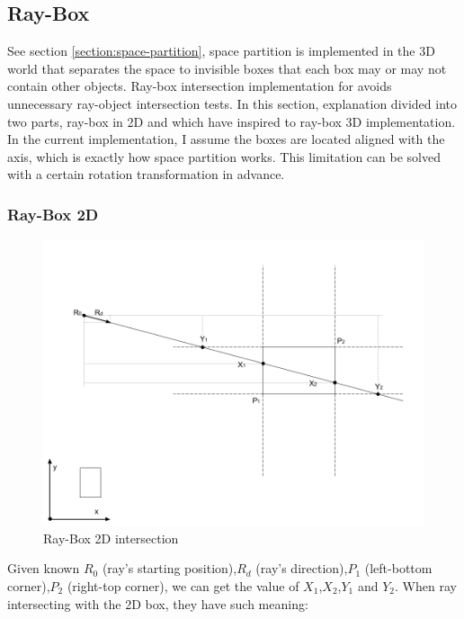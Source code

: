 \subsection{Ray-Box}
\label{section:ray-box}

See section \ref{section:space-partition}, space partition is implemented in the 3D world that separates the space to invisible boxes that each box may or may not contain other objects. Ray-box intersection implementation for avoids unnecessary ray-object intersection tests. In this section, explanation divided into two parts, ray-box in 2D and which have inspired to ray-box 3D implementation. In the current implementation, I assume the boxes are located aligned with the axis, which is exactly how space partition works. This limitation can be solved with a certain rotation transformation in advance.

\subsubsection{Ray-Box 2D}

\begin{figure}[H]
\caption{Ray-Box 2D intersection}
\label{fig:ray-box-2d}
\centering
\includegraphics[width=\linewidth]{Figures/ray-box-2d-intersection.png}
\decoRule
\end{figure}

Given known $R_0$ (ray's starting position),\enspace$R_d$ (ray's direction),\enspace$P_1$ (left-bottom corner),\enspace$P_2$ (right-top corner), we can get the value of $X_1$,\enspace$X_2$,\enspace$Y_1$ and $Y_2$. When ray intersecting with the 2D box, they have such meaning:

